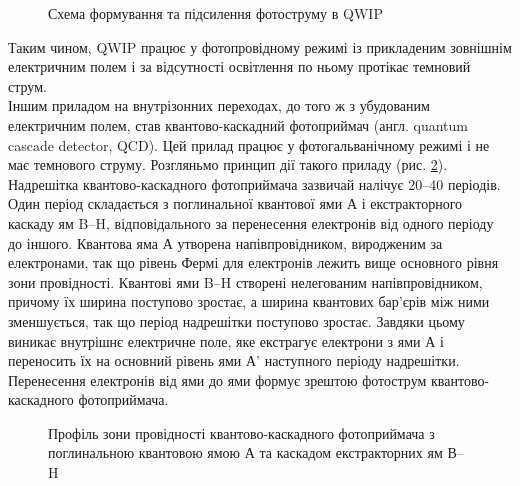 \documentclass[a4paper,14pt]{extreport}
\begin{document}
\begin{figure}[h!]
   \caption{Схема формування та підсилення фотоструму в QWIP}
   \label{r1}
 \end{figure}
Таким чином, QWIP працює у фотопровідному режимі із прикладеним
зовнішнім електричним полем і за відсутності освітлення по ньому
протікає темновий струм.\\ 

Іншим приладом на внутрізонних переходах, до того ж з
убудованим електричним полем, став квантово-каскадний
фотоприймач (англ. quantum cascade detector, QCD). Цей прилад
працює у фотогальванічному режимі і не має темнового струму.
Розгляньмо принцип дії такого приладу (рис. \ref{r2}).\\ 

Надрешітка квантово-каскадного фотоприймача зазвичай налічує
20–40 періодів. Один період складається з поглинальної квантової ями
А і екстракторного каскаду ям B–H, відповідального за перенесення
електронів від одного періоду до іншого. Квантова яма А утворена
напівпровідником, виродженим за електронами, так що рівень Фермі
для електронів лежить вище основного рівня зони провідності.
Квантові ями B–H створені нелегованим напівпровідником, причому їх
ширина поступово зростає, а ширина квантових бар’єрів між ними
зменшується, так що період надрешітки поступово зростає. Завдяки
цьому виникає внутрішнє електричне поле, яке екстрагує електрони з
ями А і переносить їх на основний рівень ями А' наступного періоду 
надрешітки. Перенесення електронів від ями до ями формує зрештою
фотострум квантово-каскадного фотоприймача.\\ 

\begin{figure}[h!]
   \caption{Профіль зони провідності квантово-каскадного фотоприймача
з поглинальною квантовою ямою А та каскадом екстракторних ям В–H}
   \label{r2}
 \end{figure}
\end{document}
